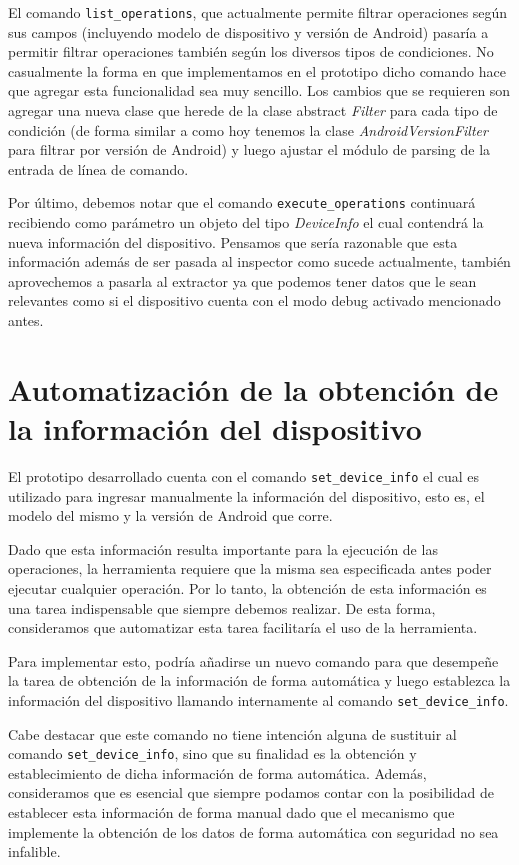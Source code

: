 El comando \texttt{list\_operations}, que actualmente permite filtrar operaciones según sus campos (incluyendo modelo de dispositivo y versión de Android) pasaría a permitir filtrar operaciones también según los diversos tipos de condiciones. No casualmente la forma en que implementamos en el prototipo dicho comando hace que agregar esta funcionalidad sea muy sencillo. Los cambios que se requieren son agregar una nueva clase que herede de la clase abstract \emph{Filter} para cada tipo de condición (de forma similar a como hoy tenemos la clase \emph{AndroidVersionFilter} para filtrar por versión de Android) y luego ajustar el módulo de parsing de la entrada de línea de comando.

Por último, debemos notar que el comando \texttt{execute\_operations} continuará recibiendo como parámetro un objeto del tipo \emph{DeviceInfo} el cual contendrá la nueva información del dispositivo. Pensamos que sería razonable que esta información además de ser pasada al inspector como sucede actualmente, también aprovechemos a pasarla al extractor ya que podemos tener datos que le sean relevantes como si el dispositivo cuenta con el modo debug activado mencionado antes.


\section{Automatización de la obtención de la información del dispositivo}
El prototipo desarrollado cuenta con el comando \texttt{set\_device\_info} el cual es utilizado para ingresar manualmente la información del dispositivo, esto es, el modelo del mismo y la versión de Android que corre.

Dado que esta información resulta importante para la ejecución de las operaciones, la herramienta requiere que la misma sea especificada antes poder ejecutar cualquier operación. Por lo tanto, la obtención de esta información es una tarea indispensable que siempre debemos realizar. De esta forma, consideramos que automatizar esta tarea facilitaría el uso de la herramienta.

Para implementar esto, podría añadirse un nuevo comando para que desempeñe la tarea de obtención de la información de forma automática y luego establezca la información del dispositivo llamando internamente al comando \texttt{set\_device\_info}.

Cabe destacar que este comando no tiene intención alguna de sustituir al comando \texttt{set\_device\_info}, sino que su finalidad es la obtención y establecimiento de dicha información de forma automática. Además, consideramos que es esencial que siempre podamos contar con la posibilidad de establecer esta información de forma manual dado que el mecanismo que implemente la obtención de los datos de forma automática con seguridad no sea infalible.

